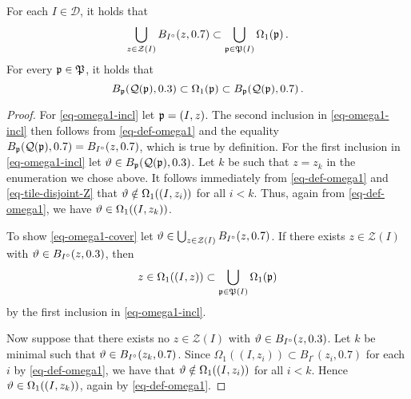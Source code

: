 {\begin{lemma}
\label{frequency-cube-cover}

    For each $I \in \mathcal{D}$, it holds that
    \begin{equation}
    \label{eq-omega1-cover}
         \bigcup_{z \in \mathcal{Z}(I)} B_{I^\circ}(z, 0.7)\subset \bigcup_{{\mathfrak p} \in {\mathfrak P}(I)} \Omega_1({\mathfrak p})\,.
    \end{equation}
    For every ${\mathfrak p} \in {\mathfrak P}$, it holds that
    \begin{equation}
        \label{eq-omega1-incl}
        B_{{\mathfrak p}}({\mathcal{Q}}({\mathfrak p}), 0.3) \subset \Omega_1({\mathfrak p}) \subset B_{{\mathfrak p}}({\mathcal{Q}}({\mathfrak p}), 0.7)\,.
    \end{equation}
\end{lemma}

\begin{proof}
    For \eqref{eq-omega1-incl} let ${\mathfrak p} = (I, z)$.
    The second inclusion in \eqref{eq-omega1-incl} then follows from \eqref{eq-def-omega1} and the equality $B_{{\mathfrak p}}({\mathcal{Q}}({\mathfrak p}), 0.7) = B_{I^\circ}(z, 0.7)$, which is true by definition.
    For the first inclusion in \eqref{eq-omega1-incl} let ${\vartheta} \in B_{{\mathfrak p}}({\mathcal{Q}}({\mathfrak p}),0.3)$. Let $k$ be such that $z = z_k$ in the enumeration we chose above. It follows immediately from \eqref{eq-def-omega1} and \eqref{eq-tile-disjoint-Z} that
    ${\vartheta} \notin \Omega_1((I, z_i))$ for all $i < k$. Thus, again from \eqref{eq-def-omega1}, we have
    ${\vartheta} \in \Omega_1((I,z_k))$.

    To show \eqref{eq-omega1-cover} let ${\vartheta} \in \bigcup_{z \in \mathcal{Z}(I)} B_{I^\circ}(z,0.7)$.
    If there exists $z \in \mathcal{Z}(I)$ with ${\vartheta} \in B_{I^\circ}(z,0.3)$, then
    $$
        z \in \Omega_1((I, z)) \subset \bigcup_{{\mathfrak p} \in {\mathfrak P}(I)} \Omega_1({\mathfrak p})
    $$
    by the first inclusion in \eqref{eq-omega1-incl}.

    Now suppose that there exists no $z \in \mathcal{Z}(I)$ with ${\vartheta} \in B_{I^\circ}(z, 0.3)$. Let $k$ be minimal such that ${\vartheta} \in B_{I^\circ}(z_k, 0.7)$. Since $\Omega_1((I, z_i)) \subset B_{I^\circ}(z_i, 0.7)$ for each $i$ by \eqref{eq-def-omega1}, we have that ${\vartheta} \notin \Omega_1((I, z_i))$ for all $i < k$. Hence ${\vartheta} \in \Omega_1((I, z_k))$, again by \eqref{eq-def-omega1}.
\end{proof}

}
